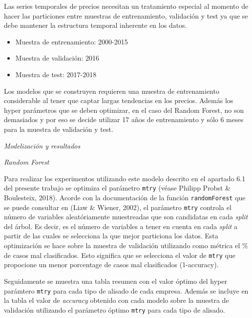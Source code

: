 \documentclass[]{DissertateUSU}
\providecommand{\tightlist}{%
  \setlength{\itemsep}{0pt}\setlength{\parskip}{0pt}}
\begin{document}
\setlength\parskip{8ex}

\noindent Las series temporales de precios necesitan un tratamiento
especial al momento de hacer las particiones entre muestras de
entrenamiento, validación y test ya que se debe mantener la estructura
temporal inherente en los datos.

\begin{itemize}
\tightlist
\item
  Muestra de entrenamiento: 2000-2015
\item
  Muestra de validación: 2016
\item
  Muestra de test: 2017-2018
\end{itemize}

\setlength\parskip{8ex}

\noindent Los modelos que se construyen requieren una muestra de
entrenamiento considerable al tener que captar largas tendencias en los
precios. Además los hyper parámetros que se deben optimizar, en el caso
del Random Forest, no son demasiados y por eso se decide utilizar 17
años de entrenamiento y sólo 6 meses para la muestra de validación y
test.

\emph{Modelización y resultados}

\emph{Random Forest}

\setlength\parskip{5ex}

\noindent Para realizar los experimentos utilizando este modelo descrito
en el apartado 6.1 del presente trabajo se optimiza el parámetro
\texttt{mtry} (véase Philipp Probst \& Boulesteix, 2018). Acorde con la
documentación de la función \texttt{randomForest} que se puede consultar
en (Liaw \& Wiener, 2002), el parámetro \texttt{mtry} controla el número
de variables aleatóriamente muestreadas que son candidatas en cada
\emph{split} del árbol. Es decir, es el número de variables a tener en
cuenta en cada \emph{split} a partir de las cuales se selecciona la que
mejor particiona los datos. Esta optimización se hace sobre la muestra
de validación utilizando como métrica el \% de casos mal clasificados.
Esto significa que se selecciona el valor de \texttt{mtry} que
propocione un menor porcentage de casos mal clasificados (1-accuracy).

\setlength\parskip{5ex}

\noindent Seguidamente se muestra una tabla resumen con el valor óptimo
del hyper parámtero \texttt{mtry} para cada tipo de alisado de cada
empresa. Además se incluye en la tabla el valor de \emph{accuracy}
obtenido con cada modelo sobre la muestra de validación utilizando el
parámetro óptimo \texttt{mtry} para cada tipo de alisado.
\end{document}
